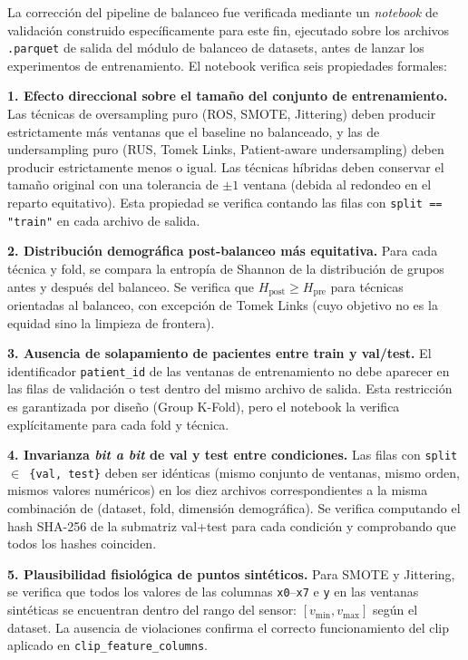 La corrección del pipeline de balanceo fue verificada mediante un \emph{notebook} de validación construido específicamente para este fin, ejecutado sobre los archivos \texttt{.parquet} de salida del módulo de balanceo de datasets, antes de lanzar los experimentos de entrenamiento. El notebook verifica seis propiedades formales:

\textbf{1. Efecto direccional sobre el tamaño del conjunto de entrenamiento.} Las técnicas de oversampling puro (ROS, SMOTE, Jittering) deben producir estrictamente más ventanas que el baseline no balanceado, y las de undersampling puro (RUS, Tomek Links, Patient-aware undersampling) deben producir estrictamente menos o igual. Las técnicas híbridas deben conservar el tamaño original con una tolerancia de $\pm 1$ ventana (debida al redondeo en el reparto equitativo). Esta propiedad se verifica contando las filas con \texttt{split == "train"} en cada archivo de salida.

\textbf{2. Distribución demográfica post-balanceo más equitativa.} Para cada técnica y fold, se compara la entropía de Shannon de la distribución de grupos antes y después del balanceo. Se verifica que $H_\text{post} \geq H_\text{pre}$ para técnicas orientadas al balanceo, con excepción de Tomek Links (cuyo objetivo no es la equidad sino la limpieza de frontera).

\textbf{3. Ausencia de solapamiento de pacientes entre train y val/test.} El identificador \texttt{patient\_id} de las ventanas de entrenamiento no debe aparecer en las filas de validación o test dentro del mismo archivo de salida. Esta restricción es garantizada por diseño (Group K-Fold), pero el notebook la verifica explícitamente para cada fold y técnica.

\textbf{4. Invarianza \emph{bit a bit} de val y test entre condiciones.} Las filas con \texttt{split $\in$ \{val, test\}} deben ser idénticas (mismo conjunto de ventanas, mismo orden, mismos valores numéricos) en los diez archivos correspondientes a la misma combinación de (dataset, fold, dimensión demográfica). Se verifica computando el hash SHA-256 de la submatriz val+test para cada condición y comprobando que todos los hashes coinciden.

\textbf{5. Plausibilidad fisiológica de puntos sintéticos.} Para SMOTE y Jittering, se verifica que todos los valores de las columnas \texttt{x0}--\texttt{x7} e \texttt{y} en las ventanas sintéticas se encuentran dentro del rango del sensor: $[v_\text{min}, v_\text{max}]$ según el dataset. La ausencia de violaciones confirma el correcto funcionamiento del clip aplicado en \texttt{clip\_feature\_columns}.

